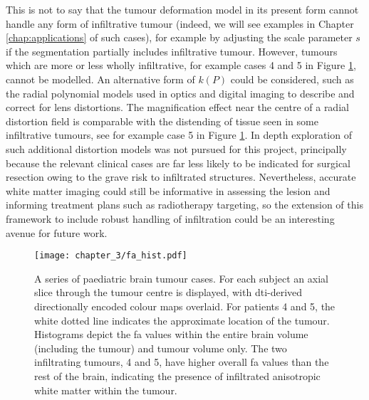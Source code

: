 This is not to say that the tumour deformation model in its present form cannot handle any form of infiltrative tumour (indeed, we will see examples in Chapter \ref{chap:applications} of such cases), for example by adjusting the scale parameter $s$ if the segmentation partially includes infiltrative tumour.
However, tumours which are more or less wholly infiltrative, for example cases 4 and 5 in Figure \ref{fig:fa_hist}, cannot be modelled.
An alternative form of $k(P)$ could be considered, such as the radial polynomial models used in optics and digital imaging to describe and correct for lens distortions.\autocite{Zhang2000a}
The magnification effect near the centre of a radial distortion field is comparable with the distending of tissue seen in some infiltrative tumours, see for example case 5 in Figure \ref{fig:fa_hist}.
In depth exploration of such additional distortion models was not pursued for this project, principally because the relevant clinical cases are far less likely to be indicated for surgical resection owing to the grave risk to infiltrated structures.
Nevertheless, accurate white matter imaging could still be informative in assessing the lesion and informing treatment plans such as radiotherapy targeting,\autocite{Jena2005,Berberat2014} so the extension of this framework to include robust handling of infiltration could be an interesting avenue for future work.

\begin{figure}[htb!]
  \texttt{[image: chapter\_3/fa\_hist.pdf]}
  \caption{A series of paediatric brain tumour cases. For each subject an axial slice through the tumour centre is displayed, with \gls{dti}-derived directionally encoded colour maps overlaid. For patients 4 and 5, the white dotted line indicates the approximate location of the tumour. Histograms depict the \gls{fa} values within the entire brain volume (including the tumour) and tumour volume only. The two infiltrating tumours, 4 and 5, have higher overall \gls{fa} values than the rest of the brain, indicating the presence of infiltrated anisotropic white matter within the tumour.}
  \label{fig:fa_hist}
\end{figure}

